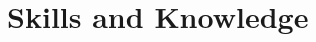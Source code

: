 \documentclass[letterpaper,11pt]{article}
\newif\ifML  %
\newif\ifWebDev  %
\newif\ifHardware  %
\begin{document}
      \ifWebDev
        
        
      \fi

      \ifHardware
        
      \fi
    \resumeSubHeadingListEnd

  \ifML
  \else
    \section[Skills and Knowledge]{{\small\faTools}~Skills and Knowledge}
      
  \fi
\end{document}
